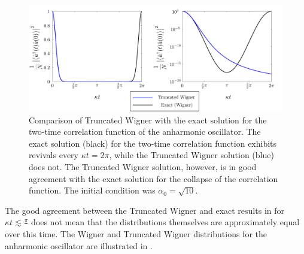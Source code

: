 \begin{figure}
    \centering
    \includegraphics[width=15cm]{TwoTimeTWComparison}
    \caption{
        Comparison of Truncated Wigner with the exact solution for the two-time correlation function of the anharmonic oscillator.  The exact solution (black) for the two-time correlation function exhibits revivals every $\kappa t = 2\pi$, while the Truncated Wigner solution (blue) does not.  The Truncated Wigner solution, however, is in good agreement with the exact solution for the collapse of the correlation function.  The initial condition was $\alpha_0 = \sqrt{10}$. \label{BackgroundTheory:TwoTimeTWComparison}
    }
\end{figure}

The good agreement between the Truncated Wigner and exact results in  for $\kappa t \lesssim \frac{\pi}{}$ does not mean that the distributions themselves are approximately equal over this time.  The Wigner and Truncated Wigner distributions for the anharmonic oscillator are illustrated in .

